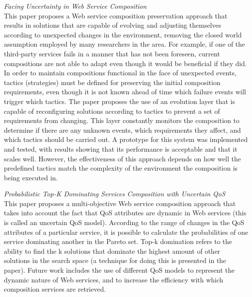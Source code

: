 \textit{Facing Uncertainty in Web Service Composition \cite{alferez2013facing}}\\
This paper proposes a Web service composition preservation approach that results in solutions that are capable of evolving and adjusting themselves according
to unexpected changes in the environment, removing the closed world assumption employed by many researchers in the area. For example, if one of
the third-party services fails in a manner that has not been foreseen, current compositions are not able to adapt even though it would be beneficial
if they did. In order to maintain compositions functional in the face of unexpected events, tactics (strategies) must be defined for preserving
the initial composition requirements, even though it is not known ahead of time which failure events will trigger which tactics. The paper proposes
the use of an evolution layer that is capable of reconfiguring solutions according to tactics to prevent a set of requirements from changing. This
layer constantly monitors the composition to determine if there are any unknown events, which requirements they affect, and which tactics should be
carried out. A prototype for this system was implemented and tested, with results showing that its performance is acceptable and that it scales well.
However, the effectiveness of this approach depends on how well the predefined tactics match the complexity of the environment the composition is
being executed in.

\textit{Probabilistic Top-K Dominating Services Composition with Uncertain QoS \cite{DBLP:journals/soca/WenTLCLH14}}\\
This paper proposes a multi-objective Web service composition approach that takes into account the fact that QoS attributes are dynamic
in Web services (this is called an uncertain QoS model). According to the range of changes in the QoS attributes of a particular service,
it is possible to calculate the probabilities of one service dominating another in the Pareto set. Top-k domination refers to the ability
to find the k solutions that dominate the highest amount of other solutions in the search space (a technique for doing this is presented
in the paper). Future work includes the use of different QoS models to represent the dynamic nature of Web services, and to increase the
efficiency with which composition services are retrieved.

